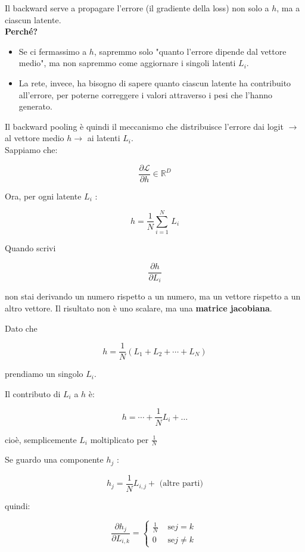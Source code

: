\documentclass[
  11pt,
]{article}
\begin{document}
Il backward serve a propagare l'errore (il gradiente
della loss) non solo a \(h\), ma a ciascun latente.\\
\textbf{Perché?}

\begin{itemize}
\item
  Se ci fermassimo a \(h\), sapremmo solo "quanto
  l'errore dipende dal vettore medio", ma non sapremmo
  come aggiornare i singoli latenti \(L_{i}\).
\item
  La rete, invece, ha bisogno di sapere quanto ciascun latente ha
  contribuito all'errore, per poterne correggere i
  valori attraverso i pesi che l'hanno generato.
\end{itemize}

Il backward pooling è quindi il meccanismo che distribuisce
l'errore dai logit \(\rightarrow\) al vettore medio
\(h \rightarrow\) ai latenti \(L_{i}\).\\
Sappiamo che:

\[\frac{\partial\mathcal{L}}{\partial h} \in \mathbb{R}^{D}\]

Ora, per ogni latente \(L_{i}\) :

\[h = \frac{1}{N}\sum_{i = 1}^{N}\, L_{i}\]

Quando scrivi

\[\frac{\partial h}{\partial L_{i}}\]

non stai derivando un numero rispetto a un numero, ma un vettore
rispetto a un altro vettore. Il risultato non è uno scalare, ma una
\textbf{matrice jacobiana}.

Dato che

\[h = \frac{1}{N}\left( L_{1} + L_{2} + \cdots + L_{N} \right)\]

prendiamo un singolo \(L_{i}\).

Il contributo di \(L_{i}\) a \(h\) è:

\[h = \cdots + \frac{1}{N}L_{i} + \ldots\]

cioè, semplicemente \(L_{i}\) moltiplicato per \(\frac{1}{N}\)

Se guardo una componente \(h_{j}\) :

\[h_{j} = \frac{1}{N}L_{i,j} + \text{ (altre parti)}\]

quindi:

\[\frac{\partial h_{j}}{\partial L_{i,k}} = \left\{ \begin{matrix}
\frac{1}{N} & \text{ se}j = k \\
0 & \text{ se}j \neq k
\end{matrix} \right.\ \]
\end{document}
